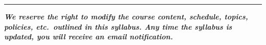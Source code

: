 
\vspace{1em}

\hrule

\vspace{1em}

\emph{\textbf{We reserve the right to modify the course content, 
schedule, topics, policies, etc.\ outlined in this syllabus.
Any time the syllabus is updated, you will receive an email notification.}}

